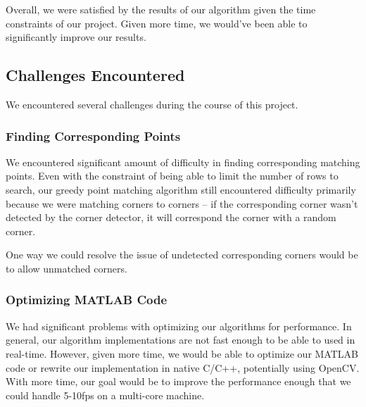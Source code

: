 Overall, we were satisfied by the results of our algorithm given the time constraints of our project. Given more time, we would've been able to significantly improve our results. 

\subsection{Challenges Encountered}
\label{conclusion:challenges}
We encountered several challenges during the course of this project. 
\subsubsection{Finding Corresponding Points}
We encountered significant amount of difficulty in finding corresponding matching points. Even with the constraint of being able to limit the number of rows to search, our greedy point matching algorithm still encountered difficulty primarily because we were matching corners to corners -- if the corresponding corner wasn't detected by the corner detector, it will correspond the corner with a random corner. 

One way we could resolve the issue of undetected corresponding corners would be to allow unmatched corners. 

\subsubsection{Optimizing MATLAB Code}
We had significant problems with optimizing our algorithms for performance. In general, our algorithm implementations are not fast enough to be able to used in real-time. However, given more time, we would be able to optimize our MATLAB code or rewrite our implementation in native C/C++, potentially using OpenCV. With more time, our goal would be to improve the performance enough that we could handle 5-10fps on a multi-core machine. 